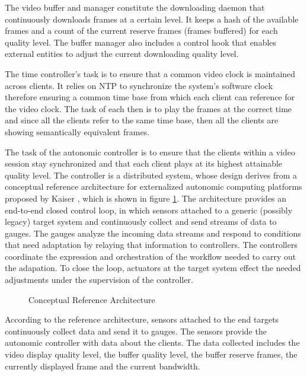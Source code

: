 \documentclass{sig-alternate}
\begin{document}
The video buffer and manager constitute the downloading daemon that
continuously downloads frames at a certain level.  It keeps a hash of
the available frames and a count of the current reserve frames (frames
buffered) for each quality level.  The buffer manager also includes a
control hook that enables external entities to adjust the current
downloading quality level.

The time controller's task is to ensure that a common video clock is
maintained across clients.  It relies on NTP \cite{NTP} to synchronize
the system's software clock therefore ensuring a common time base from
which each client can reference for the video clock.  The task of each
then is to play the frames at the correct time and since all the
clients refer to the same time base, then all the clients are showing
semantically equivalent frames.

The task of the autonomic controller is to ensure that the clients
within a video session stay synchronized and that each client plays at
its highest attainable quality level.  The controller is a distributed
system, whose design derives from a conceptual reference architecture
for externalized autonomic computing platforms proposed by Kaiser
\cite{REFARCH}, which is shown in figure \ref{refarch}. The
architecture provides an end-to-end closed control loop, in which
sensors attached to a generic (possibly legacy) target system and
continuously collect and send streams of data to gauges.  The gauges
analyze the incoming data streams and respond to conditions that need
adaptation by relaying that information to controllers.  The
controllers coordinate the expression and orchestration of the
workflow needed to carry out the adapation.  To close the loop,
actuators at the target system effect the needed adjustments under the
supervision of the controller.


%
%

\begin{figure}
 \centering
  \label{refarch}
 \caption{Conceptual Reference Architecture}
\end{figure}


According to the reference architecture, sensors attached to the end
targets continuously collect data and send it to gauges.  The sensors
provide the autonomic controller with data about the clients.  The
data collected includes the video display quality level, the buffer
quality level, the buffer reserve frames, the currently displayed
frame and the current bandwidth.
\end{document}

